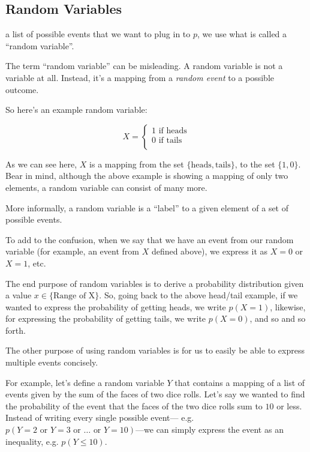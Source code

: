 \documentclass{tufte-handout}
\begin{document}
\subsection{Random Variables}

 a list of possible events that we want to plug in to
$p$, we use what is called a ``random variable''.

The term ``random variable'' can be misleading. A random variable is not a
variable at all. Instead, it's a mapping from a \emph{random event} to a
possible outcome.

So here's an example random variable:

\begin{equation}
  X =
    \begin{cases}
      1 \text{ if } \text{heads} \\
      0 \text{ if } \text{tails} \\
    \end{cases}
\end{equation}

As we can see here, $X$ is a mapping from the set $\{ \text{heads},
\text{tails} \}$, to the set $\{ 1, 0 \}$. Bear in mind, although the above
example is showing a mapping of only two elements, a random variable can consist
of many more.

More informally, a random variable is a ``label'' to a given element of a set of
possible events.

To add to the confusion, when we say that we have an event from our random
variable (for example, an event from $X$ defined above), we express it as
$X = 0$ or $X = 1$, etc.

The end purpose of random variables is to derive a probability distribution
given a value $x \in \{ \text{Range of X} \}$. So, going back to the above
head/tail example, if we wanted to express the probability of getting heads, we
write $p(X = 1)$, likewise, for expressing the probability of getting tails, we
write $p(X = 0)$, and so and so forth.

The other purpose of using random variables is for us to easily be able to
express multiple events concisely.

For example, let's define a random variable $Y$ that contains a mapping of a
list of events given by the sum of the faces of two dice rolls. Let's say we
wanted to find the probability of the event that the faces of the two dice rolls
sum to $10$ or less. Instead of writing every single possible event---
e.g. $p(Y = 2 \text{ or } Y = 3 \text{ or } \ldots \text{ or } Y = 10)$---we can
simply express the event as an inequality, e.g. $p(Y \leq 10)$.
\end{document}
